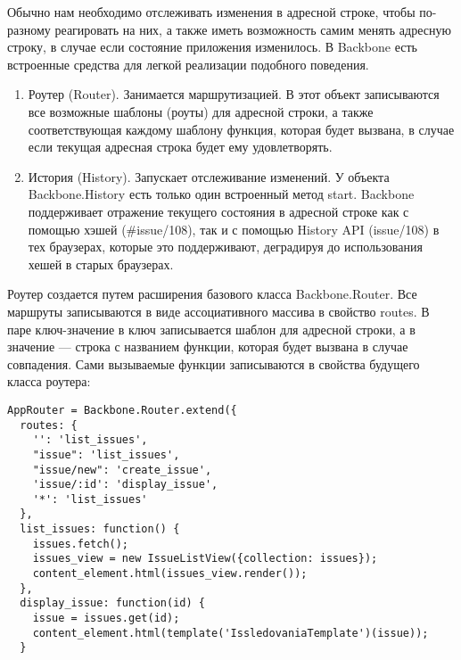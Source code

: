 Обычно нам необходимо отслеживать изменения в адресной строке, чтобы по-разному реагировать на них, а также иметь возможность самим менять адресную строку, в случае если состояние приложения изменилось. В Backbone есть встроенные средства для легкой реализации подобного поведения.
\begin{enumerate}
\item Роутер (Router). Занимается маршрутизацией. В этот объект записываются все возможные шаблоны (роуты) для адресной строки, а также соответствующая каждому шаблону функция, которая будет вызвана, в случае если текущая адресная строка будет ему удовлетворять\cite{backbone}.

\item История (History). Запускает отслеживание изменений. У объекта Backbone.History есть только один встроенный метод start. Backbone поддерживает отражение текущего состояния в адресной строке как с помощью хэшей (\#issue/108), так и с помощью History API (issue/108) в тех браузерах, которые это поддерживают, деградируя до использования хешей в старых браузерах\cite{backbone}.
\end{enumerate}

Роутер создается путем расширения базового класса Backbone.Router. Все маршруты записываются в виде ассоциативного массива в свойство routes. В паре ключ-значение в ключ записывается шаблон для адресной строки, а в значение --- строка с названием функции, которая будет вызвана в случае совпадения. Сами вызываемые функции записываются в свойства будущего класса роутера:
\begin{lstlisting}
AppRouter = Backbone.Router.extend({
  routes: {
    '': 'list_issues',
    "issue": 'list_issues',
    "issue/new": 'create_issue',
    'issue/:id': 'display_issue',
    '*': 'list_issues'
  },
  list_issues: function() {
    issues.fetch();
    issues_view = new IssueListView({collection: issues});
    content_element.html(issues_view.render());
  },
  display_issue: function(id) {
    issue = issues.get(id);
    content_element.html(template('IssledovaniaTemplate')(issue));
  }
\end{lstlisting}


